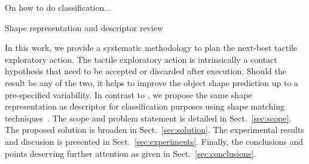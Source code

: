 

On how to do classification...

Shape representation and descriptor review \citet{Zhang2004Review}

In this work, we provide a systematic methodology to plan the next-best tactile exploratory action. The tactile exploratory action is intrinsically a contact hypothesis that need to be accepted or discarded after execution. Should the result be any of the two, it helps to improve the object shape prediction up to a pre-specified variability. In contrast to \citet{Bjorkman2013Enhancing}, we propose the same shape representation as descriptor for classification purposes using shape matching techniques~\citep{Belongie2002Shape}. The scope and problem statement is detailed in Sect.~\ref{sec:scope}. The proposed solution is broaden in Sect.~\ref{sec:solution}. The experimental results and discusion is presented in Sect.~\ref{sec:experiments}. Finally, the conclusions and points deserving further attention as given in Sect.~\ref{sec:conclusions}. 
